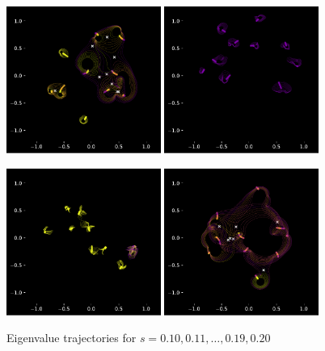 \documentclass{article}
\begin{document}
	\begin{figure}[htbp]
		\centering
		\includegraphics[width=0.45\textwidth]{figures/N10Circle01to02.pdf}
		\includegraphics[width=0.45\textwidth]{figures/N10Meander01to02.pdf}

		\includegraphics[width=0.45\textwidth]{figures/N10Crossing01to02.pdf}
		\includegraphics[width=0.45\textwidth]{figures/N10Circle01to02B.pdf}
		\caption{Eigenvalue trajectories for $s= 0.10, 0.11, \dots , 0.19, 0.20$ }
		\label{fig:pdf_image}
	\end{figure}
\end{document}
